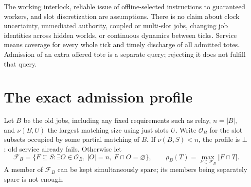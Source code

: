 \documentclass[11pt]{article}
\begin{document}
The working interlock, reliable issue of offline-selected instructions to guaranteed workers, and slot discretization are assumptions. There is no claim about clock uncertainty, unmediated authority, coupled or multi-slot jobs, changing job identities across hidden worlds, or continuous dynamics between ticks. Service means coverage for every whole tick and timely discharge of all admitted totes. Admission of an extra offered tote is a separate query; rejecting it does not fulfill that query.

\section{The exact admission profile}
Let $B$ be the old jobs, including any fixed requirements such as relay, $n=|B|$, and $\nu(B,U)$ the largest matching size using just slots $U$. Write $\mathcal O_B$ for the slot subsets occupied by some partial matching of $B$. If $\nu(B,S)<n$, the profile is $\bot$: old service already fails. Otherwise let
\[
 \mathcal F_B=\{F\subseteq S:\exists O\in\mathcal O_B,\ |O|=n,\ F\cap O=\varnothing\},
 \qquad \rho_B(T)=\max_{F\in\mathcal F_B}|F\cap T|.
\]
A member of $\mathcal F_B$ can be kept simultaneously spare; its members being separately spare is not enough.
\end{document}
